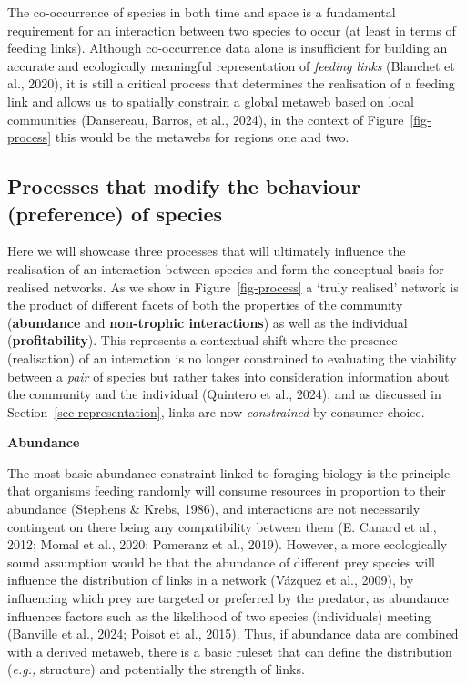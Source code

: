 \documentclass[
]{article}
\begin{document}
The co-occurrence of species in both time and space is a fundamental
requirement for an interaction between two species to occur (at least in
terms of feeding links). Although co-occurrence data alone is
insufficient for building an accurate and ecologically meaningful
representation of \emph{feeding links} (Blanchet et al., 2020), it is
still a critical process that determines the realisation of a feeding
link and allows us to spatially constrain a global metaweb based on
local communities (Dansereau, Barros, et al., 2024), in the context of
Figure~\ref{fig-process} this would be the metawebs for regions one and
two.

\subsection{Processes that modify the behaviour (preference) of
species}\label{sec-process-realisation}

Here we will showcase three processes that will ultimately influence the
realisation of an interaction between species and form the conceptual
basis for realised networks. As we show in Figure~\ref{fig-process} a
`truly realised' network is the product of different facets of both the
properties of the community (\textbf{abundance} and \textbf{non-trophic
interactions}) as well as the individual (\textbf{profitability}). This
represents a contextual shift where the presence (realisation) of an
interaction is no longer constrained to evaluating the viability between
a \emph{pair} of species but rather takes into consideration information
about the community and the individual (Quintero et al., 2024), and as
discussed in Section~\ref{sec-representation}, links are now
\emph{constrained} by consumer choice.

\textbf{Abundance}

The most basic abundance constraint linked to foraging biology is the
principle that organisms feeding randomly will consume resources in
proportion to their abundance (Stephens \& Krebs, 1986), and
interactions are not necessarily contingent on there being any
compatibility between them (E. Canard et al., 2012; Momal et al., 2020;
Pomeranz et al., 2019). However, a more ecologically sound assumption
would be that the abundance of different prey species will influence the
distribution of links in a network (Vázquez et al., 2009), by
influencing which prey are targeted or preferred by the predator, as
abundance influences factors such as the likelihood of two species
(individuals) meeting (Banville et al., 2024; Poisot et al., 2015).
Thus, if abundance data are combined with a derived metaweb, there is a
basic ruleset that can define the distribution (\emph{e.g.,} structure)
and potentially the strength of links.
\end{document}
